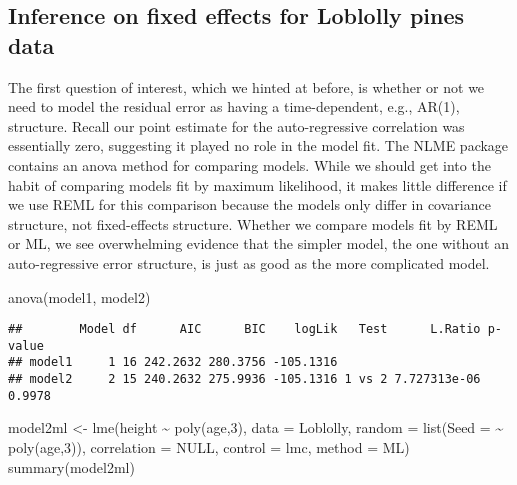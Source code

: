 \documentclass[
]{book}
\newenvironment{Shaded}{\begin{snugshade}}{\end{snugshade}}
\newcommand{\AttributeTok}[1]{\textcolor[rgb]{0.77,0.63,0.00}{#1}}
\newcommand{\ConstantTok}[1]{\textcolor[rgb]{0.00,0.00,0.00}{#1}}
\newcommand{\DecValTok}[1]{\textcolor[rgb]{0.00,0.00,0.81}{#1}}
\newcommand{\FunctionTok}[1]{\textcolor[rgb]{0.00,0.00,0.00}{#1}}
\newcommand{\NormalTok}[1]{#1}
\newcommand{\OtherTok}[1]{\textcolor[rgb]{0.56,0.35,0.01}{#1}}
\newcommand{\SpecialCharTok}[1]{\textcolor[rgb]{0.00,0.00,0.00}{#1}}
\newcommand{\StringTok}[1]{\textcolor[rgb]{0.31,0.60,0.02}{#1}}
\begin{document}
\hypertarget{inference-on-fixed-effects-for-loblolly-pines-data}{%
\subsection{Inference on fixed effects for Loblolly pines data}\label{inference-on-fixed-effects-for-loblolly-pines-data}}

The first question of interest, which we hinted at before, is whether or not we need to model the residual error as having a time-dependent, e.g., AR(1), structure. Recall our point estimate for the auto-regressive correlation was essentially zero, suggesting it played no role in the model fit. The NLME package contains an anova method for comparing models. While we should get into the habit of comparing models fit by maximum likelihood, it makes little difference if we use REML for this comparison because the models only differ in covariance structure, not fixed-effects structure. Whether we compare models fit by REML or ML, we see overwhelming evidence that the simpler model, the one without an auto-regressive error structure, is just as good as the more complicated model.

\begin{Shaded}
\begin{Highlighting}[]
\FunctionTok{anova}\NormalTok{(model1, model2)}
\end{Highlighting}
\end{Shaded}

\begin{verbatim}
##        Model df      AIC      BIC    logLik   Test      L.Ratio p-value
## model1     1 16 242.2632 280.3756 -105.1316                            
## model2     2 15 240.2632 275.9936 -105.1316 1 vs 2 7.727313e-06  0.9978
\end{verbatim}

\begin{Shaded}
\begin{Highlighting}[]
\NormalTok{model2ml }\OtherTok{\textless{}{-}} \FunctionTok{lme}\NormalTok{(height }\SpecialCharTok{\textasciitilde{}} \FunctionTok{poly}\NormalTok{(age,}\DecValTok{3}\NormalTok{), }\AttributeTok{data =}\NormalTok{ Loblolly,}
\AttributeTok{random =} \FunctionTok{list}\NormalTok{(}\AttributeTok{Seed =} \SpecialCharTok{\textasciitilde{}} \FunctionTok{poly}\NormalTok{(age,}\DecValTok{3}\NormalTok{)),}
\AttributeTok{correlation =} \ConstantTok{NULL}\NormalTok{, }\AttributeTok{control =}\NormalTok{ lmc, }\AttributeTok{method =} \StringTok{\textquotesingle{}ML\textquotesingle{}}\NormalTok{)}
\FunctionTok{summary}\NormalTok{(model2ml)}
\end{Highlighting}
\end{Shaded}
\end{document}
